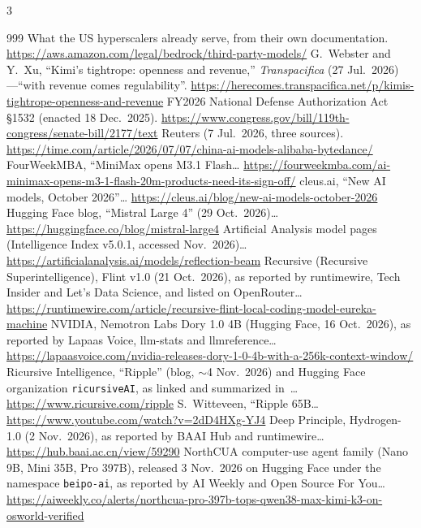 \begin{multicols}{3}
\begin{thebibliography}{999}
 What the US hyperscalers already serve, from their own documentation. \url{https://aws.amazon.com/legal/bedrock/third-party-models/}
 G.~Webster and Y.~Xu, ``Kimi's tightrope: openness and revenue,'' \emph{Transpacifica} (27 Jul.\ 2026)---``with revenue comes regulability''. \url{https://herecomes.transpacifica.net/p/kimis-tightrope-openness-and-revenue}
 FY2026 National Defense Authorization Act \S1532 (enacted 18 Dec.\ 2025). \url{https://www.congress.gov/bill/119th-congress/senate-bill/2177/text}
 Reuters (7 Jul.\ 2026, three sources). \url{https://time.com/article/2026/07/07/china-ai-models-alibaba-bytedance/}
 FourWeekMBA, ``MiniMax opens M3.1 Flash… \url{https://fourweekmba.com/ai-minimax-opens-m3-1-flash-20m-products-need-its-sign-off/}
 cleus.ai, ``New AI models, October 2026''… \url{https://cleus.ai/blog/new-ai-models-october-2026}
 Hugging Face blog, ``Mistral Large 4'' (29 Oct.\ 2026)… \url{https://huggingface.co/blog/mistral-large4}
 Artificial Analysis model pages (Intelligence Index v5.0.1, accessed Nov.\ 2026)… \url{https://artificialanalysis.ai/models/reflection-beam}
 Recursive (Recursive Superintelligence), Flint v1.0 (21 Oct.\ 2026), as reported by runtimewire, Tech Insider and Let's Data Science, and listed on OpenRouter… \url{https://runtimewire.com/article/recursive-flint-local-coding-model-eureka-machine}
 NVIDIA, Nemotron Labs Dory 1.0 4B (Hugging Face, 16 Oct.\ 2026), as reported by Lapaas Voice, llm-stats and llmreference… \url{https://lapaasvoice.com/nvidia-releases-dory-1-0-4b-with-a-256k-context-window/}
 Ricursive Intelligence, ``Ripple'' (blog, $\sim$4 Nov.\ 2026) and Hugging Face organization \texttt{ricursiveAI}, as linked and summarized in~\cite{lit-witteveen-ripple}… \url{https://www.ricursive.com/ripple}
 S.~Witteveen, ``Ripple 65B… \url{https://www.youtube.com/watch?v=2dD4HXg-YJ4}
 Deep Principle, Hydrogen-1.0 (2 Nov.\ 2026), as reported by BAAI Hub and runtimewire… \url{https://hub.baai.ac.cn/view/59290}
 NorthCUA computer-use agent family (Nano 9B, Mini 35B, Pro 397B), released 3 Nov.\ 2026 on Hugging Face under the namespace \texttt{beipo-ai}, as reported by AI Weekly and Open Source For You… \url{https://aiweekly.co/alerts/northcua-pro-397b-tops-qwen38-max-kimi-k3-on-osworld-verified}

\end{thebibliography}
\end{multicols}
